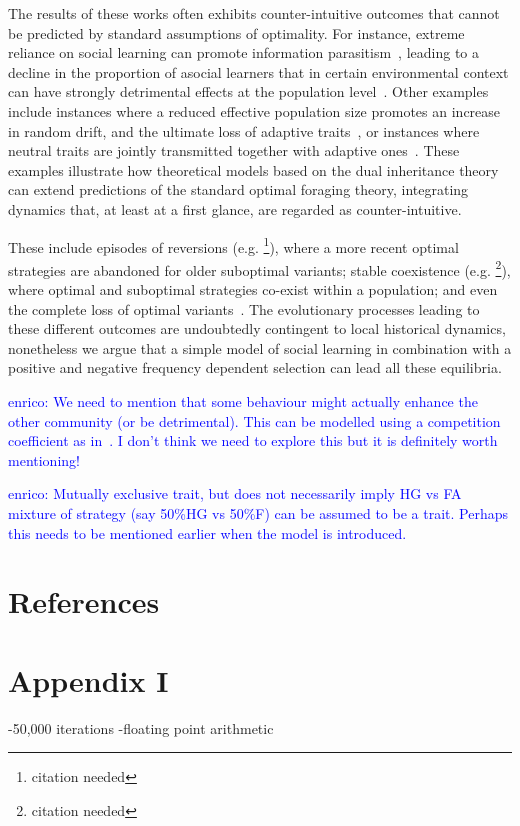 \documentclass[preprint,authoryear]{elsarticle}
\newcommand{\memo}[2]{\textcolor{#1}{#2}}
\newcommand{\enrico}[1]{\memo{blue}{enrico: #1\\}}
\begin{document}
The results of these works often exhibits counter-intuitive outcomes that cannot be predicted by standard assumptions of optimality. For instance, extreme reliance on social learning can promote information parasitism~\citep{giraldeau2002}, leading to a decline in the proportion of asocial learners that in certain environmental context can have strongly detrimental effects at the population level~\citep{whitehead2009}. Other examples include instances where a reduced effective population size promotes an increase in random drift, and the ultimate loss of adaptive traits~\citep{henrich2004}, or instances where neutral traits are jointly transmitted together with adaptive ones~\citep{ackland2007}. These examples illustrate how theoretical models based on the dual inheritance theory can extend predictions of the standard optimal foraging theory, integrating dynamics that, at least at a first glance, are regarded as counter-intuitive. 

These include episodes of reversions (e.g. \footnote{citation needed}), where a more recent optimal strategies are abandoned for older suboptimal variants; stable coexistence (e.g. \footnote{citation needed}), where optimal and suboptimal strategies co-exist within a population; and even the complete loss of optimal variants~\citep[e.g.][]{henrich2004}. The evolutionary processes leading to these different outcomes are undoubtedly contingent to local historical dynamics, nonetheless we argue that a simple model of social learning in combination with a positive and negative frequency dependent selection can lead all these equilibria.


\enrico{We need to mention that some behaviour might actually enhance the other community (or be detrimental). This can be modelled using a competition coefficient as in~\citep{jang2013}. I don't think we need to explore this but it is definitely worth mentioning!}

\enrico{Mutually exclusive trait, but does not necessarily imply HG vs FA mixture of strategy (say 50\%HG vs 50\%F) can be assumed to be a trait. Perhaps this needs to be mentioned earlier when the model is introduced.}


\section{References}




\section{Appendix I}

-50,000 iterations
-floating point arithmetic
\end{document}
